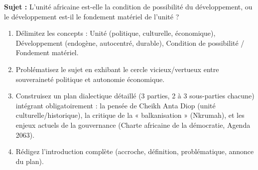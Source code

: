 \documentclass[11pt]{article}
\begin{document}
\begin{exercice}
\textbf{Sujet :} \og L'unité africaine est-elle la condition de possibilité du développement, ou le développement est-il le fondement matériel de l'unité ? \fg
\begin{enumerate}
    \item Délimitez les concepts : Unité (politique, culturelle, économique), Développement (endogène, autocentré, durable), Condition de possibilité / Fondement matériel.
    \item Problématisez le sujet en exhibant le cercle vicieux/vertueux entre souveraineté politique et autonomie économique.
    \item Construisez un plan dialectique détaillé (3 parties, 2 à 3 sous-parties chacune) intégrant obligatoirement : la pensée de Cheikh Anta Diop (unité culturelle/historique), la critique de la « balkanisation » (Nkrumah), et les enjeux actuels de la gouvernance (Charte africaine de la démocratie, Agenda 2063).
    \item Rédigez l'introduction complète (accroche, définition, problématique, annonce du plan).
\end{enumerate}
\end{exercice}
\end{document}
